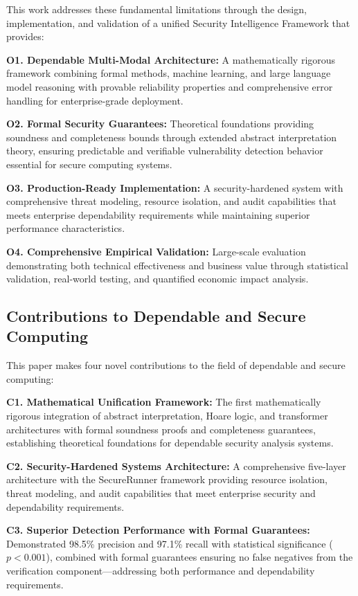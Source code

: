 \documentclass[10pt,journal,compsoc]{IEEEtran}
\begin{document}
This work addresses these fundamental limitations through the design, implementation, and validation of a unified Security Intelligence Framework that provides:

\textbf{O1. Dependable Multi-Modal Architecture:} A mathematically rigorous framework combining formal methods, machine learning, and large language model reasoning with provable reliability properties and comprehensive error handling for enterprise-grade deployment.

\textbf{O2. Formal Security Guarantees:} Theoretical foundations providing soundness and completeness bounds through extended abstract interpretation theory, ensuring predictable and verifiable vulnerability detection behavior essential for secure computing systems.

\textbf{O3. Production-Ready Implementation:} A security-hardened system with comprehensive threat modeling, resource isolation, and audit capabilities that meets enterprise dependability requirements while maintaining superior performance characteristics.

\textbf{O4. Comprehensive Empirical Validation:} Large-scale evaluation demonstrating both technical effectiveness and business value through statistical validation, real-world testing, and quantified economic impact analysis.

\subsection{Contributions to Dependable and Secure Computing}

This paper makes four novel contributions to the field of dependable and secure computing:

\textbf{C1. Mathematical Unification Framework:} The first mathematically rigorous integration of abstract interpretation, Hoare logic, and transformer architectures with formal soundness proofs and completeness guarantees, establishing theoretical foundations for dependable security analysis systems.

\textbf{C2. Security-Hardened Systems Architecture:} A comprehensive five-layer architecture with the SecureRunner framework providing resource isolation, threat modeling, and audit capabilities that meet enterprise security and dependability requirements.

\textbf{C3. Superior Detection Performance with Formal Guarantees:} Demonstrated 98.5\% precision and 97.1\% recall with statistical significance ($p < 0.001$), combined with formal guarantees ensuring no false negatives from the verification component—addressing both performance and dependability requirements.
\end{document}
